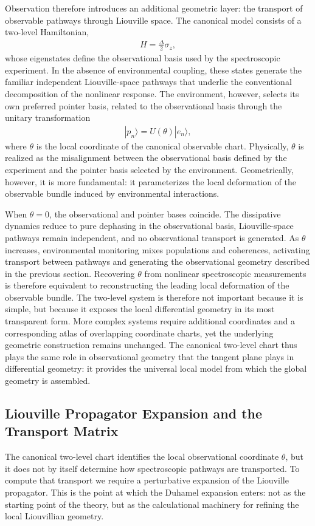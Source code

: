 Observation therefore introduces an additional geometric layer:
the transport of observable pathways through Liouville space.
The canonical model consists of a two-level Hamiltonian,
\begin{align}
H=\frac{\Delta}{2}\sigma_z,
\end{align}
whose eigenstates define the observational basis used by the
spectroscopic experiment. In the absence of environmental
coupling, these states generate the familiar independent
Liouville-space pathways that underlie the conventional
decomposition of the nonlinear response.
The environment, however, selects its own preferred pointer
basis, related to the observational basis through the unitary
transformation
\begin{align}
|p_n\rangle
=
U(\theta)
|e_n\rangle,
\end{align}
where $\theta$ is the local coordinate of the canonical
observable chart. Physically, $\theta$ is realized as the
misalignment between the observational basis defined by the
experiment and the pointer basis selected by the environment.
Geometrically, however, it is more fundamental: it parameterizes
the local deformation of the observable bundle induced by
environmental interactions.

When $\theta=0$, the observational and pointer bases coincide.
The dissipative dynamics reduce to pure dephasing in the
observational basis, Liouville-space pathways remain independent,
and no observational transport is generated. As $\theta$
increases, environmental monitoring mixes populations and
coherences, activating transport between pathways and generating
the observational geometry described in the previous section.
Recovering $\theta$ from nonlinear spectroscopic measurements is
therefore equivalent to reconstructing the leading local
deformation of the observable bundle.
The two-level system is therefore not important because it is
simple, but because it exposes the local differential geometry in
its most transparent form. More complex systems require
additional coordinates and a corresponding atlas of overlapping
coordinate charts, yet the underlying geometric construction
remains unchanged. The canonical two-level chart thus plays the
same role in observational geometry that the tangent plane plays
in differential geometry: it provides the universal local model
from which the global geometry is assembled.




\subsection{Liouville Propagator Expansion and the Transport Matrix}
\label{subsec:duhamel_transport}
The canonical two-level chart identifies the local observational
coordinate \(\theta\), but it does not by itself determine how
spectroscopic pathways are transported. To compute that transport
we require a perturbative expansion of the Liouville propagator.
This is the point at which the Duhamel expansion enters: not as
the starting point of the theory, but as the calculational
machinery for refining the local Liouvillian geometry.

